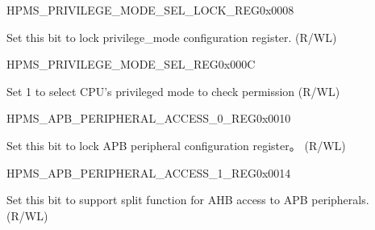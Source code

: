 


\begin{register}{H}{PMS\_PRIVILEGE\_MODE\_SEL\_LOCK\_REG}{0x0008}\label{regdesc:PMSPRIVILEGEMODESELLOCKREG}
%
%
\regnewline%
\begin{regdesc}\begin{reglist}
\label{fielddesc:PMSPRIVILEGEMODESELLOCK}\item [PMS\_PRIVILEGE\_MODE\_SEL\_LOCK] Set this bit to lock privilege\_mode configuration register. (R/WL)
\end{reglist}\end{regdesc}
\end{register}


\begin{register}{H}{PMS\_PRIVILEGE\_MODE\_SEL\_REG}{0x000C}\label{regdesc:PMSPRIVILEGEMODESELREG}
%
%
\regnewline%
\begin{regdesc}\begin{reglist}
\label{fielddesc:PMSPRIVILEGEMODESEL}\item [PMS\_PRIVILEGE\_MODE\_SEL] Set 1 to select CPU's privileged mode to check permission (R/WL)
\end{reglist}\end{regdesc}
\end{register}


\begin{register}{H}{PMS\_APB\_PERIPHERAL\_ACCESS\_0\_REG}{0x0010}\label{regdesc:PMSAPBPERIPHERALACCESS0REG}
%
%
\regnewline%
\begin{regdesc}\begin{reglist}
\label{fielddesc:PMSAPBPERIPHERALACCESSLOCK}\item [PMS\_APB\_PERIPHERAL\_ACCESS\_LOCK] Set this bit to lock APB peripheral configuration register。 (R/WL)
\end{reglist}\end{regdesc}
\end{register}


\begin{register}{H}{PMS\_APB\_PERIPHERAL\_ACCESS\_1\_REG}{0x0014}\label{regdesc:PMSAPBPERIPHERALACCESS1REG}
%
%
\regnewline%
\begin{regdesc}\begin{reglist}
\label{fielddesc:PMSAPBPERIPHERALACCESSSPLITBURST}\item [PMS\_APB\_PERIPHERAL\_ACCESS\_SPLIT\_BURST] Set this bit to support split function for AHB access to APB peripherals. (R/WL)
\end{reglist}\end{regdesc}
\end{register}


